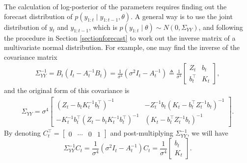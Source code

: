 The calculation of log-posterior of the parameters requires finding out the forecast distribution of $p(y_{1:t}\mid y_{1:t-1},\theta)$. A general way is to use the joint distribution of $y_{t}$ and $y_{1:t-1}$, which is $p(y_{1:t}\mid \theta)\sim N(0,\Sigma_{YY})$, and following the procedure in Section \ref{sectionforecast} to work out the inverse matrix of a multivariate normal distribution. For example, one may find the inverse of the covariance matrix 
\begin{align*}
\Sigma_{YY}^{-1} = B_t(I_t-A_t^{-1}B_t) =\frac{1}{\sigma^4}(\sigma^2 I_t-A_t^{-1}) \triangleq \frac{1}{\sigma^4} 
\begin{bmatrix} 
Z_{t} & b_{t} \\
b_{t}^\top & K_{t}
\end{bmatrix},
\end{align*}
and the original form of this covariance is 
\begin{align*} \Sigma_{YY} =\sigma^4 \begin{bmatrix}
\left(Z_t-b_tK_t^{-1}b_t^\top\right)^{-1} & -Z_t^{-1}b_t\left(K_t-b_t^\top Z_t^{-1}b_t\right)^{-1}\\
-K_t^{-1}b_t^\top \left(Z_t-b_tK_t^{-1}b_t^\top\right)^{-1} & \left(K_t-b_t^\top Z_t^{-1}b_t\right)^{-1}
\end{bmatrix}. 
\end{align*}
By denoting $C_{t}^\top = \begin{bmatrix} 0 & \cdots & 0 & 1\end{bmatrix}$ and post-multiplying $\Sigma_{YY}^{-1}$, we will have  
\begin{equation}\label{beforeSMformula}
\Sigma_{YY}^{-1} C_{t}= \frac{1}{\sigma^4}\left(\sigma^2 I_t-A_t^{-1} \right)C_{t}= \frac{1}{\sigma^4} \begin{bmatrix} b_{t} \\ K_{t} \end{bmatrix}.
\end{equation} 


